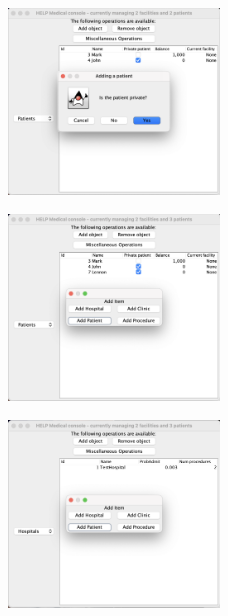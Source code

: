 \documentclass{article}
\begin{document}
\begin{figure}
  \begin{center}
    \includegraphics[width=0.5\textwidth]{./figures/Add/Patient_3.png}
  \end{center}
\end{figure}

\begin{figure}
  \begin{center}
    \includegraphics[width=0.5\textwidth]{./figures/Add/Patient_4.png}
  \end{center}
\end{figure}

\begin{figure}
  \begin{center}
    \includegraphics[width=0.5\textwidth]{./figures/Add/Procedure_1.png}
  \end{center}
\end{figure}
\end{document}
